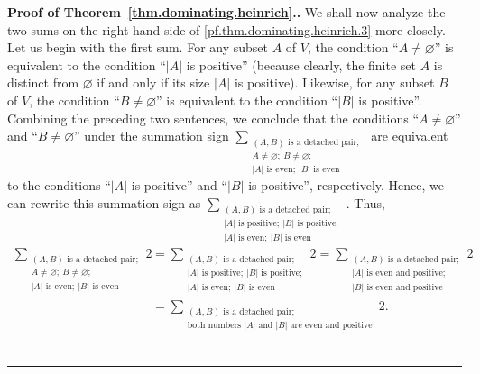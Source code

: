\documentclass[numbers=enddot,12pt,final,onecolumn,notitlepage]{scrartcl}%
\theoremstyle{definition}
\newenvironment{proof}[1][Proof]{\noindent\textbf{#1.} }{\ \rule{0.5em}{0.5em}}
\let\sumnonlimits\sum
\renewcommand{\sum}{\sumnonlimits\limits}
\newcommand{\abs}[1]{\left| #1 \right|}
\newcommand{\tup}[1]{\left( #1 \right)}
\begin{document}
\begin{proof}[Proof of Theorem~\ref{thm.dominating.heinrich}.]
We shall now analyze the two sums on the right hand side of
\eqref{pf.thm.dominating.heinrich.3} more closely.
Let us begin with the first sum. For any subset $A$ of $V$, the
condition ``$A \neq \varnothing$'' is equivalent to the condition
``$\abs{A}$ is positive'' (because clearly, the finite set $A$ is
distinct from $\varnothing$ if and only if its size $\abs{A}$ is
positive). Likewise, for any subset $B$ of $V$, the condition
``$B \neq \varnothing$'' is equivalent to the condition
``$\abs{B}$ is positive''. Combining the preceding two sentences, we
conclude that the conditions ``$A \neq \varnothing$'' and
``$B \neq \varnothing$'' under the summation sign
$\sum_{\substack{\tup{A, B} \text{ is a detached pair}; \\
                A \neq \varnothing; \  B \neq \varnothing ; \\
                \abs{A} \text{ is even};
                \ \abs{B} \text{ is even}}}$
are equivalent to the conditions ``$\abs{A}$ is positive'' and
``$\abs{B}$ is positive'', respectively. Hence, we can rewrite this
summation sign as
$\sum_{\substack{\tup{A, B} \text{ is a detached pair}; \\
                \abs{A} \text{ is positive} ; 
                \ \abs{B} \text{ is positive} ; \\
                \abs{A} \text{ is even};
                \ \abs{B} \text{ is even}}}$.
Thus,
\begin{align}
\sum_{\substack{\tup{A, B} \text{ is a detached pair}; \\
                A \neq \varnothing; \  B \neq \varnothing ; \\
                \abs{A} \text{ is even};
                \ \abs{B} \text{ is even}}}
   2
&= \sum_{\substack{\tup{A, B} \text{ is a detached pair}; \\
                \abs{A} \text{ is positive} ; 
                \ \abs{B} \text{ is positive} ; \\
                \abs{A} \text{ is even};
                \ \abs{B} \text{ is even}}} 2
= \sum_{\substack{\tup{A, B} \text{ is a detached pair}; \\
                \abs{A} \text{ is even and positive} ; \\ 
                \abs{B} \text{ is even and positive}}} 2
\nonumber \\
&= \sum_{\substack{\tup{A, B} \text{ is a detached pair}; \\
                \text{both numbers } \abs{A} \text{ and } \abs{B}
                \text{ are even and positive}}} 2 .

\end{align}
\end{proof}
\end{document}
